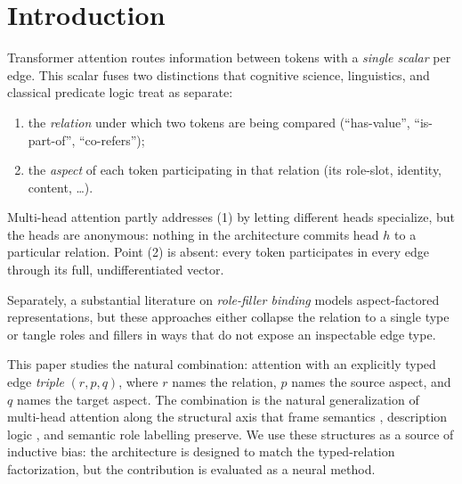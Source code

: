 \documentclass{article}
\begin{document}
\section{Introduction}

Transformer attention \citep{vaswani2017attention} routes information
between tokens with a \emph{single scalar} per edge. This scalar fuses
two distinctions that cognitive science, linguistics, and classical predicate logic treat as separate:
\begin{enumerate}
    \item the \emph{relation} under which two tokens are being compared
      (``has-value'', ``is-part-of'', ``co-refers'');
    \item the \emph{aspect} of each token participating in that relation
      (its role-slot, identity, content, \ldots).
\end{enumerate}
Multi-head attention \citep{vaswani2017attention} partly addresses (1)
by letting different heads specialize, but the heads are anonymous:
nothing in the architecture commits head $h$ to a particular relation.
Point (2) is absent: every token participates in every edge through
its full, undifferentiated vector.

Separately, a substantial literature on \emph{role-filler binding}
\citep{smolensky1990tensor, plate1995holographic, schlag2019enhancing,
sabour2017dynamic, hinton2021glom} models aspect-factored
representations, but these approaches either collapse the relation to a
single type or tangle roles and fillers in ways that do not expose an
inspectable edge type.

This paper studies the natural combination: attention with an
explicitly typed edge \emph{triple} $(r, p, q)$, where $r$ names the
relation, $p$ names the source aspect, and $q$ names the target aspect.
The combination is the natural generalization of multi-head
attention along the structural axis that frame semantics
\citep{fillmore1976}, description logic \citep{baader2003description},
and semantic role labelling \citep{palmer2005propbank} preserve. We use these structures as a source of inductive bias: the
architecture is designed to match the typed-relation factorization,
but the contribution is evaluated as a neural method.
\end{document}
